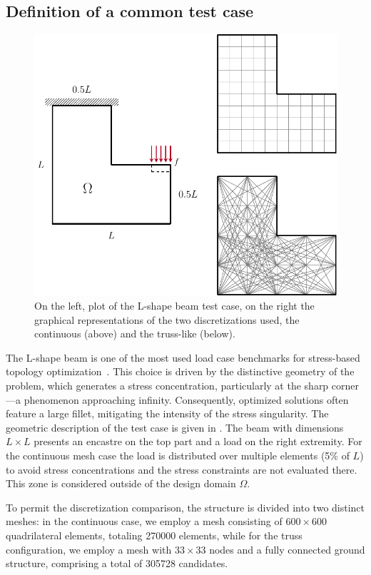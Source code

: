 \subsection{Definition of a common test case}
\begin{figure}
    \centering
    \includegraphics[scale=0.75]{figures/03_comparison_TO_TTO/06_L_bc/L_bc.pdf}
    \caption{On the left, plot of the L-shape beam test case, on the right the graphical representations of the two discretizations used, the continuous (above) and the truss-like (below).}
    \label{fig:03_L_bc}
\end{figure}
The L-shape beam is one of the most used load case benchmarks for stress-based topology optimization~. This choice is driven by the distinctive geometry of the problem, which generates a stress concentration, particularly at the sharp corner—a phenomenon approaching infinity. Consequently, optimized solutions often feature a large fillet, mitigating the intensity of the stress singularity. The geometric description of the test case is given in . The beam with dimensions $L\times L$ presents an encastre on the top part and a load on the right extremity. For the continuous mesh case the load is distributed over multiple elements (5\% of $L$) to avoid stress concentrations and the stress constraints are not evaluated there. This zone is considered outside of the design domain $\Omega$.

To permit the discretization comparison, the structure is divided into two distinct meshes: in the continuous case, we employ a mesh consisting of $600\times600$ quadrilateral elements, totaling \num[group-separator={$\,$}]{270000} elements, while for the truss configuration, we employ a mesh with $33\times 33$ nodes and a fully connected ground structure, comprising a total of \num[group-separator={$\,$}]{305728} candidates.

